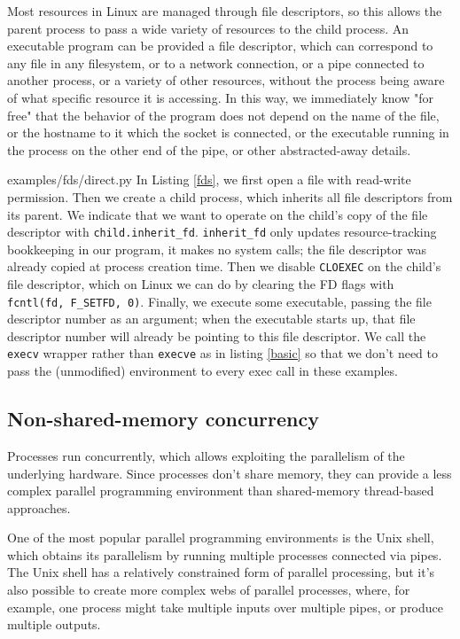 \documentclass[sigplan]{acmart}
\begin{document}
Most resources in Linux are managed through file descriptors,
so this allows the parent process to pass a wide variety of resources to the child process.
An executable program can be provided a file descriptor,
which can correspond to any file in any filesystem,
or to a network connection\cite{ucspi},
or a pipe connected to another process,
or a variety of other resources,
without the process being aware of what specific resource it is accessing.
In this way, we immediately know "for free"\cite{theoremsforfree}
that the behavior of the program does not depend on the name of the file,
or the hostname to it which the socket is connected,
or the executable running in the process on the other end of the pipe,
or other abstracted-away details.


{examples/fds/direct.py}
In Listing \ref{fds},
we first open a file with read-write permission.
Then we create a child process,
which inherits all file descriptors from its parent.
We indicate that we want to operate on the child's copy of the file descriptor with \verb|child.inherit_fd|.
\verb|inherit_fd| only updates resource-tracking bookkeeping in our program,
it makes no system calls;
the file descriptor was already copied at process creation time.
Then we disable \texttt{CLOEXEC} on the child's file descriptor,
which on Linux we can do by clearing the FD flags with \verb|fcntl(fd, F_SETFD, 0)|.
Finally, we execute some executable,
passing the file descriptor number as an argument;
when the executable starts up, that file descriptor number will already be pointing to this file descriptor.
We call the \texttt{execv} wrapper rather than \texttt{execve} as in listing \ref{basic}
so that we don't need to pass the (unmodified) environment to every exec call in these examples.
\subsection{Non-shared-memory concurrency}
Processes run concurrently,
which allows exploiting the parallelism of the underlying hardware.
Since processes don't share memory,
they can provide a less complex parallel programming environment
than shared-memory thread-based approaches.

One of the most popular parallel programming environments is the Unix shell,
which obtains its parallelism by running multiple processes connected via pipes.
The Unix shell has a relatively constrained form of parallel processing,
but it's also possible to create more complex webs of parallel processes,
where, for example, one process might take multiple inputs over multiple pipes,
or produce multiple outputs.
\end{document}
